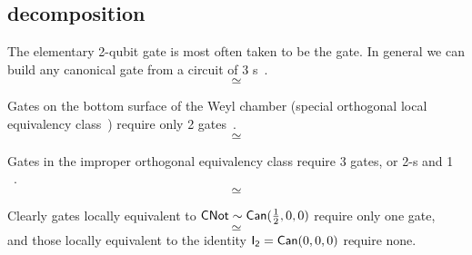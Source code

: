 \subsection{ decomposition}
The elementary 2-qubit gate is most often taken to be the  gate. In general we can build any canonical gate from a circuit of 3 s~\cite{Vidal2004a, Vatan2004a}.
$$

\simeq

$$

Gates on the bottom surface of the Weyl chamber (special orthogonal local equivalency class~) require only 2  gates~\cite{Vidal2004a,Vatan2004a}.
$$

\simeq

$$

Gates in the improper orthogonal equivalency class  require 3  gates, or 2-s and 1 ~\cite{Vatan2004a}.
$$

\simeq

$$

Clearly gates locally equivalent to $\Gate{CNot}\loceq\Gate{Can}(\half, 0,0)$ require only one  gate, 
$$

\simeq

$$
and those locally equivalent to the identity $\Gate{I_2}=\Gate{Can}(0, 0,0)$ require none. 

